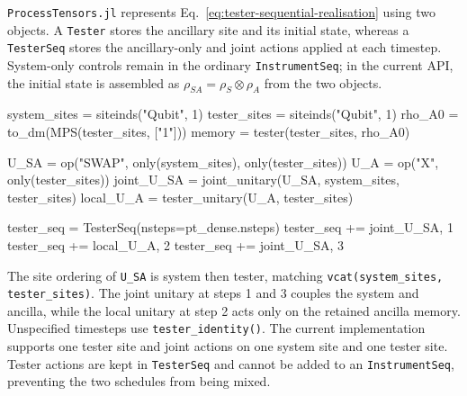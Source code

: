 \texttt{ProcessTensors.jl} represents Eq.~\eqref{eq:tester-sequential-realisation} using two objects.
A \texttt{Tester} stores the ancillary site and its initial state, whereas a \texttt{TesterSeq} stores the ancillary-only and joint actions applied at each timestep.
System-only controls remain in the ordinary \texttt{InstrumentSeq}; in the current API, the initial state is assembled as \(\rho_{SA}=\rho_S\otimes\rho_A\) from the two objects.
%
\begin{juliacode}[
    caption={A single-qubit tester with reusable joint and local unitaries.},
    label={lst:tester-seq-example},
]
system_sites = siteinds("Qubit", 1)
tester_sites = siteinds("Qubit", 1)
rho_A0 = to_dm(MPS(tester_sites, ["1"]))
memory = tester(tester_sites, rho_A0)

U_SA = op("SWAP", only(system_sites), only(tester_sites))
U_A = op("X", only(tester_sites))
joint_U_SA = joint_unitary(U_SA, system_sites, tester_sites)
local_U_A = tester_unitary(U_A, tester_sites)

tester_seq = TesterSeq(nsteps=pt_dense.nsteps)
tester_seq += joint_U_SA, 1
tester_seq += local_U_A, 2
tester_seq += joint_U_SA, 3
\end{juliacode}
%
The site ordering of \texttt{U\_SA} is system then tester, matching \texttt{vcat(system\_sites, tester\_sites)}.
The joint unitary at steps 1 and 3 couples the system and ancilla, while the local unitary at step 2 acts only on the retained ancilla memory.
Unspecified timesteps use \texttt{tester\_identity()}.
The current implementation supports one tester site and joint actions on one system site and one tester site.
Tester actions are kept in \texttt{TesterSeq} and cannot be added to an \texttt{InstrumentSeq}, preventing the two schedules from being mixed.

\label{subsec:evaluate-and-evolve}

